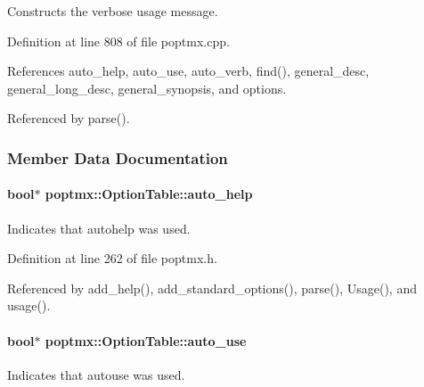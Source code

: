 Constructs the verbose usage message. 



Definition at line 808 of file poptmx.cpp.



References auto\_\-help, auto\_\-use, auto\_\-verb, find(), general\_\-desc, general\_\-long\_\-desc, general\_\-synopsis, and options.



Referenced by parse().



\subsubsection{Member Data Documentation}
\hypertarget{classpoptmx_1_1OptionTable_ac2e25d315d20c51f227ae6b256e0e8f9}{
\paragraph[{auto\_\-help}]{\setlength{\rightskip}{0pt plus 5cm}bool$\ast$ {\bf poptmx::OptionTable::auto\_\-help}}\hfill}
\label{classpoptmx_1_1OptionTable_ac2e25d315d20c51f227ae6b256e0e8f9}


Indicates that autohelp was used. 



Definition at line 262 of file poptmx.h.



Referenced by add\_\-help(), add\_\-standard\_\-options(), parse(), Usage(), and usage().

\hypertarget{classpoptmx_1_1OptionTable_ae6a353a7f18bdf76b7e408e014fc6883}{
\paragraph[{auto\_\-use}]{\setlength{\rightskip}{0pt plus 5cm}bool$\ast$ {\bf poptmx::OptionTable::auto\_\-use}}\hfill}
\label{classpoptmx_1_1OptionTable_ae6a353a7f18bdf76b7e408e014fc6883}


Indicates that autouse was used. 



